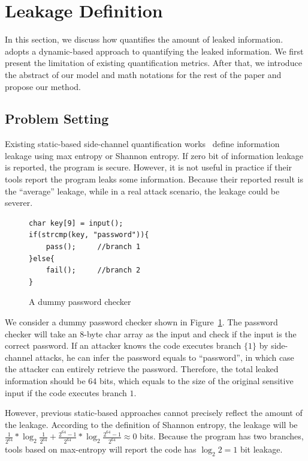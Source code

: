 \section{\tool{} Leakage Definition}
\label{sec:trace-qif}
In this section, we discuss how \tool{} quantifies the amount of leaked
information. \tool{} adopts a dynamic-based approach to quantifying the leaked
information. We first present the limitation of existing quantification metrics.
After that, we introduce the abstract of our model and math notations for the
rest of the paper and propose our method.

\subsection{Problem Setting}
Existing static-based side-channel quantification
works~\cite{182946,Wichelmann:2018:MFF:3274694.3274741 } define information
leakage using max entropy or Shannon entropy.  If zero bit of
information leakage is reported, the program is secure. However, it is not
useful in practice if their tools report the program leaks some information.
Because their reported result is the ``average'' leakage, while in a real attack
scenario, the leakage could be severer.


\begin{figure}[h!]
    \centering
    \begin{lstlisting}[xleftmargin=.03\textwidth,xrightmargin=.01\textwidth]
char key[9] = input();
if(strcmp(key, "password")){
    pass();     //branch 1
}else{
    fail();     //branch 2
}
\end{lstlisting}
\vspace*{-9pt}
    \caption{A dummy password checker}
    \label{fig:password-checker}
\end{figure}

We consider a dummy password checker shown in Figure~\ref{fig:password-checker}.
The password checker will take an 8-byte char array as the input and check if
the input is the correct password. If an attacker knows the code executes branch
$\{{1\}}$ by side-channel attacks, he can infer the password equals to
``password'', in which case the attacker can entirely retrieve the password.
Therefore, the total leaked information should be 64 bits, which equals to the
size of the original sensitive input if the code executes branch
$1$.

However, previous static-based approaches cannot precisely reflect the amount of
the leakage. According to the definition of Shannon entropy, the leakage will be
$\frac{1}{2^{64}}*\log_{2}\frac{1}{2^{64}} + \frac{2^{64}-1}{2^{64}}
*\log_{2}\frac{2^{64}-1}{2^{64}} \approx 0$ bits. Because the program has two
branches, tools based on max-entropy will report the code has $\log_2{2} = 1$
bit leakage.

